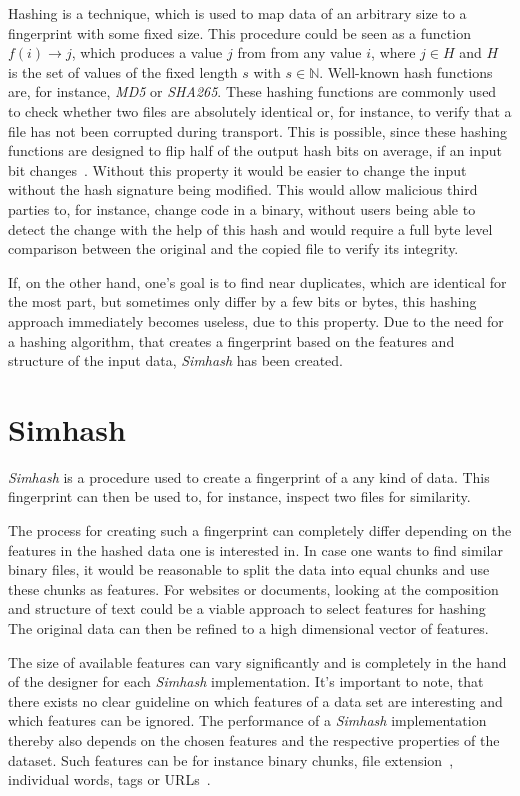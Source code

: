 \documentclass[12pt,a4paper,DIV=calc]{scrartcl}
\begin{document}
Hashing is a technique, which is used to map data of an arbitrary size to a fingerprint with some fixed size.
This procedure could be seen as a function  $f(i) \rightarrow j$, which produces a value $j$ from from any value $i$, where $j \in H$ and $H$ is the set of values of the fixed length $s$ with $s \in \mathbb{N}$.
Well-known hash functions are, for instance, \emph{MD5} or \emph{SHA265}.
These hashing functions are commonly used to check whether two files are absolutely identical or, for instance, to verify that a file has not been corrupted during transport.
This is possible, since these hashing functions are designed to flip half of the output hash bits on average, if an input bit changes~\cite{book:hashing}.
Without this property it would be easier to change the input without the hash signature being modified.
This would allow malicious third parties to, for instance, change code in a binary, without users being able to detect the change with the help of this hash and would require a full byte level comparison between the original and the copied file to verify its integrity.

If, on the other hand, one's goal is to find near duplicates, which are identical for the most part, but sometimes only differ by a few bits or bytes, this hashing approach immediately becomes useless, due to this property.
Due to the need for a hashing algorithm, that creates a fingerprint based on the features and structure of the input data, \emph{Simhash} has been created.


\section{Simhash}

\emph{Simhash} is a procedure used to create a fingerprint of a any kind of data.
This fingerprint can then be used to, for instance, inspect two files for similarity.

The process for creating such a fingerprint can completely differ depending on the features in the hashed data one is interested in.
In case one wants to find similar binary files, it would be reasonable to split the data into equal chunks and use these chunks as features.
For websites or documents, looking at the composition and structure of text could be a viable approach to select features for hashing
The original data can then be refined to a high dimensional vector of features.

The size of available features can vary significantly and is completely in the hand of the designer for each \emph{Simhash} implementation.
It's important to note, that there exists no clear guideline on which features of a data set are interesting and which features can be ignored.
The performance of a \emph{Simhash} implementation thereby also depends on the chosen features and the respective properties of the dataset.
Such features can be for instance binary chunks, file extension~\cite{inproc:simhash}, individual words, tags or URLs~\cite{inproc:main}.
\end{document}
